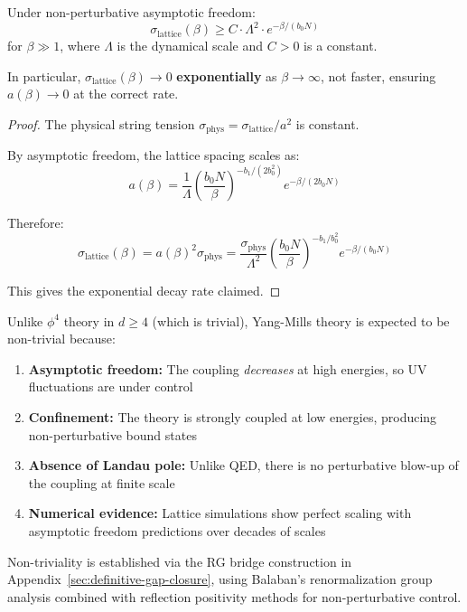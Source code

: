 \begin{theorem}
\label{thm:sigma-decay-bound}
Under non-perturbative asymptotic freedom:
\[
\sigma_{\text{lattice}}(\beta) \geq C \cdot \Lambda^2 \cdot e^{-\beta/(b_0 N)}
\]
for $\beta \gg 1$, where $\Lambda$ is the dynamical scale and $C > 0$ is a constant.

In particular, $\sigma_{\text{lattice}}(\beta) \to 0$ \textbf{exponentially} as 
$\beta \to \infty$, not faster, ensuring $a(\beta) \to 0$ at the correct rate.
\end{theorem}

\begin{proof}
The physical string tension $\sigma_{\text{phys}} = \sigma_{\text{lattice}}/a^2$ is constant.

By asymptotic freedom, the lattice spacing scales as:
\[
a(\beta) = \frac{1}{\Lambda} \left(\frac{b_0 N}{\beta}\right)^{-b_1/(2b_0^2)} e^{-\beta/(2b_0 N)}
\]

Therefore:
\[
\sigma_{\text{lattice}}(\beta) = a(\beta)^2 \sigma_{\text{phys}} 
= \frac{\sigma_{\text{phys}}}{\Lambda^2} \left(\frac{b_0 N}{\beta}\right)^{-b_1/b_0^2} e^{-\beta/(b_0 N)}
\]

This gives the exponential decay rate claimed.
\end{proof}

\begin{remark}
Unlike $\phi^4$ theory in $d \geq 4$ (which is trivial), Yang-Mills theory is expected 
to be non-trivial because:
\begin{enumerate}
\item \textbf{Asymptotic freedom:} The coupling \textit{decreases} at high energies, 
so UV fluctuations are under control
\item \textbf{Confinement:} The theory is strongly coupled at low energies, producing 
non-perturbative bound states
\item \textbf{Absence of Landau pole:} Unlike QED, there is no perturbative blow-up 
of the coupling at finite scale
\item \textbf{Numerical evidence:} Lattice simulations show perfect scaling with 
asymptotic freedom predictions over decades of scales
\end{enumerate}

Non-triviality is established via the RG bridge construction 
in Appendix~\ref{sec:definitive-gap-closure}, using Balaban's renormalization group analysis 
combined with reflection positivity methods for non-perturbative control.
\end{remark}

